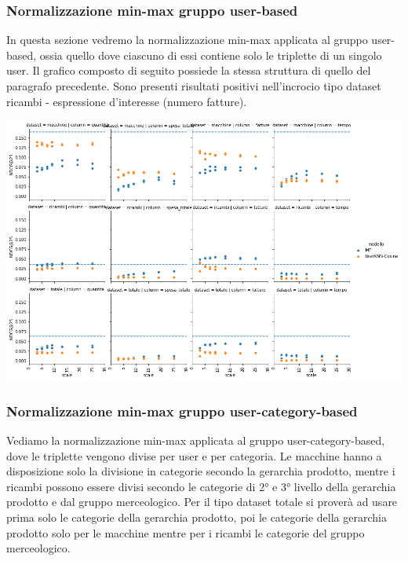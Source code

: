 \subsubsection{Normalizzazione min-max gruppo user-based}
In questa sezione vedremo la normalizzazione min-max applicata al gruppo user-based, ossia quello dove ciascuno di essi contiene solo le triplette di un singolo user. Il grafico composto di seguito possiede la stessa struttura di quello del paragrafo precedente. Sono presenti risultati positivi nell'incrocio tipo dataset ricambi - espressione d'interesse (numero fatture).
\begin{center}
\includegraphics[width=16cm]{figures/risultati_minmax_singolo.png}
\label{tab:minmax_user_based}
\end{center}

\subsubsection{Normalizzazione min-max gruppo user-category-based}
Vediamo la normalizzazione min-max applicata al gruppo user-category-based, dove le triplette vengono divise per user e per categoria.
Le macchine hanno a disposizione solo la divisione in categorie secondo la gerarchia prodotto, mentre i ricambi possono essere divisi secondo le categorie di 2° e 3° livello della gerarchia prodotto e dal gruppo merceologico. Per il tipo dataset totale si proverà ad usare prima solo le categorie della gerarchia prodotto, poi le categorie della gerarchia prodotto solo per le macchine mentre per i ricambi le categorie del gruppo merceologico.
